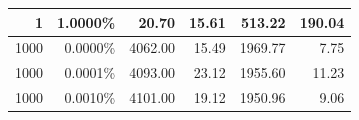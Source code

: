 \documentclass[12pt,a4paper]{report}
\begin{document}
\begin{table}[H]
\begin{tabular}{|r|r|r|r|r|r|}
1                                                                                               & 1.0000\%                                                                                             & 20.70                                                                                                 & 15.61                                                                                                                               & 513.22                                                                                                                                     & 190.04                                                                                                                            \\ \hline
1000                                                                                            & 0.0000\%                                                                                             & 4062.00                                                                                               & 15.49                                                                                                                               & 1969.77                                                                                                                                    & 7.75                                                                                                                              \\ \hline
1000                                                                                            & 0.0001\%                                                                                             & 4093.00                                                                                               & 23.12                                                                                                                               & 1955.60                                                                                                                                    & 11.23                                                                                                                             \\ \hline
1000                                                                                            & 0.0010\%                                                                                             & 4101.00                                                                                               & 19.12                                                                                                                               & 1950.96                                                                                                                                    & 9.06                                                                                                                              \\ \hline

\end{tabular}
\end{table}
\end{document}
